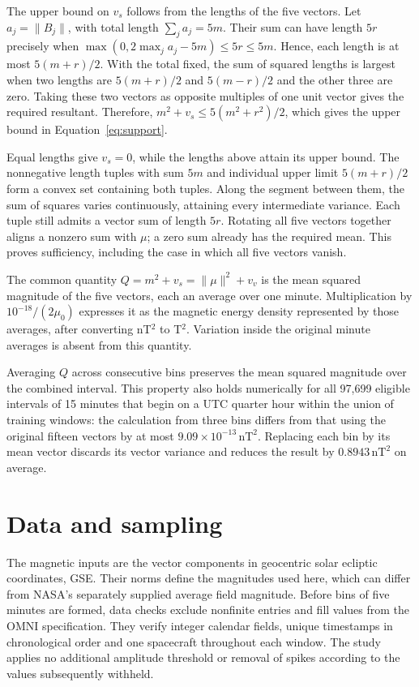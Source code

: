 \documentclass{article}
\begin{document}
The upper bound on $v_s$ follows from the lengths of the five vectors. Let $a_j=\|B_j\|$, with total length $\sum_j a_j=5m$. Their sum can have length $5r$ precisely when $\max(0,2\max_j a_j-5m)\le5r\le5m$. Hence, each length is at most $5(m+r)/2$. With the total fixed, the sum of squared lengths is largest when two lengths are $5(m+r)/2$ and $5(m-r)/2$ and the other three are zero. Taking these two vectors as opposite multiples of one unit vector gives the required resultant. Therefore, $m^2+v_s\le5(m^2+r^2)/2$, which gives the upper bound in Equation~\ref{eq:support}.

Equal lengths give $v_s=0$, while the lengths above attain its upper bound. The nonnegative length tuples with sum $5m$ and individual upper limit $5(m+r)/2$ form a convex set containing both tuples. Along the segment between them, the sum of squares varies continuously, attaining every intermediate variance. Each tuple still admits a vector sum of length $5r$. Rotating all five vectors together aligns a nonzero sum with $\mu$; a zero sum already has the required mean. This proves sufficiency, including the case in which all five vectors vanish.

The common quantity $Q=m^2+v_s=\|\mu\|^2+v_v$ is the mean squared magnitude of the five vectors, each an average over one minute. Multiplication by $10^{-18}/(2\mu_0)$ expresses it as the magnetic energy density represented by those averages, after converting nT$^2$ to T$^2$. Variation inside the original minute averages is absent from this quantity.

Averaging $Q$ across consecutive bins preserves the mean squared magnitude over the combined interval. This property also holds numerically for all 97{,}699 eligible intervals of 15 minutes that begin on a UTC quarter hour within the union of training windows: the calculation from three bins differs from that using the original fifteen vectors by at most $9.09\times10^{-13}\,\mathrm{nT}^2$. Replacing each bin by its mean vector discards its vector variance and reduces the result by $0.8943\,\mathrm{nT}^2$ on average.

\section{Data and sampling}
\label{app:quality}



The magnetic inputs are the vector components in geocentric solar ecliptic coordinates, GSE. Their norms define the magnitudes used here, which can differ from NASA's separately supplied average field magnitude. Before bins of five minutes are formed, data checks exclude nonfinite entries and fill values from the OMNI specification. They verify integer calendar fields, unique timestamps in chronological order and one spacecraft throughout each window. The study applies no additional amplitude threshold or removal of spikes according to the values subsequently withheld.
\end{document}
